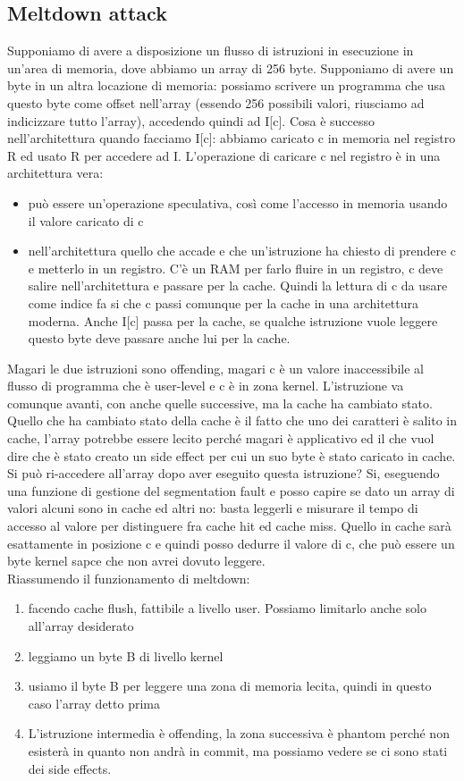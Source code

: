 \documentclass[14pt, oneside]{book}
\begin{document}
\subsection{Meltdown attack}
Supponiamo di avere a disposizione un flusso di istruzioni in esecuzione in un'area di memoria, dove abbiamo un array di 256 byte. Supponiamo di avere un byte in un altra locazione di memoria: possiamo scrivere un programma che usa questo byte come offset nell'array (essendo 256 possibili valori, riusciamo ad indicizzare tutto l'array), accedendo quindi ad I[c]. Cosa è successo nell'architettura quando facciamo I[c]: abbiamo caricato c in memoria nel registro R ed usato R per accedere ad I. L'operazione di caricare c nel registro è in una architettura vera:
\begin{itemize}
\item può essere un'operazione speculativa, così come l'accesso in memoria usando il valore caricato di c
\item nell'architettura quello che accade e che un'istruzione ha chiesto di prendere c e metterlo in un registro. C'è un RAM per farlo fluire in un registro, c deve salire nell'architettura e passare per la cache. Quindi la lettura di c da usare come indice fa si che c passi comunque per la cache in una architettura moderna. Anche I[c] passa per la cache, se qualche istruzione vuole leggere questo byte deve passare anche lui per la cache.
\end{itemize}
Magari le due istruzioni sono offending, magari c è un valore inaccessibile al flusso di programma che è user-level e c è in zona kernel. L'istruzione va comunque avanti, con anche quelle successive, ma la cache ha cambiato stato. Quello che ha cambiato stato della cache è il fatto che uno dei caratteri è salito in cache, l'array potrebbe essere lecito perché magari è applicativo ed il che vuol dire che è stato creato un side effect per cui un suo byte è stato caricato in cache. Si può ri-accedere all'array dopo aver eseguito questa istruzione? Si, eseguendo una funzione di gestione del segmentation fault e posso capire se dato un array di valori alcuni sono in cache ed altri no: basta leggerli e misurare il tempo di accesso al valore per distinguere fra cache hit ed cache miss. Quello in cache sarà esattamente in posizione c e quindi posso dedurre il valore di c, che può essere un byte kernel sapce che non avrei dovuto leggere.\\ Riassumendo il funzionamento di meltdown:
\begin{enumerate}
\item facendo cache flush, fattibile a livello user. Possiamo limitarlo anche solo all'array desiderato
\item leggiamo un byte B di livello kernel
\item usiamo il byte B per leggere una zona di memoria lecita, quindi in questo caso l'array detto prima
\item L'istruzione intermedia è offending, la zona successiva è phantom perché non esisterà in quanto non andrà in commit, ma possiamo vedere se ci sono stati dei side effects.
\end{enumerate} 
\end{document}
